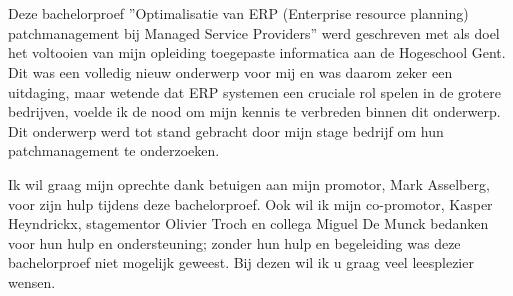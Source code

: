 
\chapter*{}%
\label{ch:voorwoord}



Deze bachelorproef ”Optimalisatie van ERP (Enterprise resource planning)
patchmanagement bij Managed Service Providers” werd geschreven met
als doel het voltooien van mijn opleiding toegepaste informatica aan de Hogeschool Gent.
Dit was een volledig nieuw onderwerp voor mij en was daarom zeker een uitdaging, maar wetende dat ERP systemen een cruciale rol spelen in de grotere bedrijven, voelde ik de nood om mijn kennis 
te verbreden binnen dit onderwerp. Dit onderwerp werd tot stand gebracht door mijn stage bedrijf om hun patchmanagement te onderzoeken.

Ik wil graag mijn oprechte dank betuigen aan mijn promotor, Mark Asselberg, voor zijn hulp tijdens deze bachelorproef. Ook wil ik mijn co-promotor, Kasper Heyndrickx, stagementor Olivier 
Troch en collega Miguel De Munck bedanken voor hun hulp en ondersteuning; zonder hun hulp en begeleiding was deze bachelorproef niet mogelijk geweest. Bij dezen wil ik u graag veel leesplezier wensen.